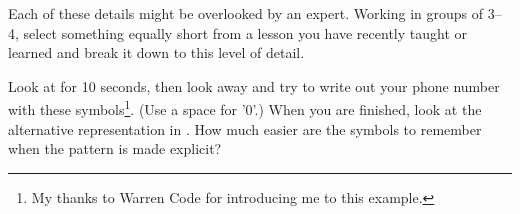 Each of these details might be overlooked by an expert.
Working in groups of 3--4,
select something equally short from a lesson you have recently taught or learned
and break it down to this level of detail.


Look at  for 10 seconds,
then look away and try to write out your phone number with these symbols\footnote{
  My thanks to Warren Code for introducing me to this example.
}.
(Use a space for '0'.)
When you are finished,
look at the alternative representation in .
How much easier are the symbols to remember when the pattern is made explicit?


